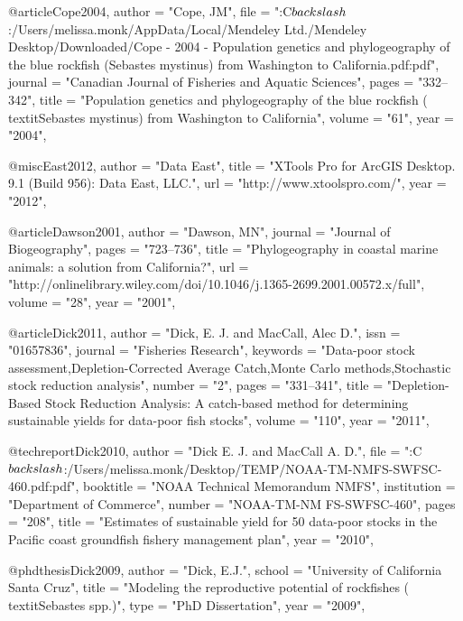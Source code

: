 @article{Cope2004,
    author = "{Cope, JM}",
    file = "{:C$\\backslash$:/Users/melissa.monk/AppData/Local/Mendeley Ltd./Mendeley Desktop/Downloaded/Cope - 2004 - Population genetics and phylogeography of the blue rockfish (Sebastes mystinus) from Washington to California.pdf:pdf}",
    journal = "{Canadian Journal of Fisheries and Aquatic Sciences}",
    pages = "{332--342}",
    title = "{{Population genetics and phylogeography of the blue rockfish (\\textit{{Sebastes} mystinus}) from Washington to California}}",
    volume = "{61}",
    year = "{2004}",
}

@misc{East2012,
    author = "{{Data East}}",
    title = "{{XTools Pro for ArcGIS Desktop. 9.1 (Build 956): Data East, LLC.}}",
    url = "{http://www.xtoolspro.com/}",
    year = "{2012}",
}

@article{Dawson2001,
    author = "{Dawson, MN}",
    journal = "{Journal of Biogeography}",
    pages = "{723--736}",
    title = "{{Phylogeography in coastal marine animals: a solution from California?}}",
    url = "{http://onlinelibrary.wiley.com/doi/10.1046/j.1365-2699.2001.00572.x/full}",
    volume = "{28}",
    year = "{2001}",
}

@article{Dick2011,
    author = "{Dick, E. J. and MacCall, Alec D.}",
    issn = "{01657836}",
    journal = "{Fisheries Research}",
    keywords = "{Data-poor stock assessment,Depletion-Corrected Average Catch,Monte Carlo methods,Stochastic stock reduction analysis}",
    number = "{2}",
    pages = "{331--341}",
    title = "{{Depletion-Based Stock Reduction Analysis: A catch-based method for determining sustainable yields for data-poor fish stocks}}",
    volume = "{110}",
    year = "{2011}",
}

@techreport{Dick2010,
    author = "{Dick E. J. and MacCall A. D.}",
    file = "{:C$\\backslash$:/Users/melissa.monk/Desktop/TEMP/NOAA-TM-NMFS-SWFSC-460.pdf:pdf}",
    booktitle = "{NOAA Technical Memorandum NMFS}",
    institution = "{Department of Commerce}",
    number = "{NOAA-TM-NM FS-SWFSC-460}",
    pages = "{208}",
    title = "{{Estimates of sustainable yield for 50 data-poor stocks in the Pacific coast groundfish fishery management plan}}",
    year = "{2010}",
}

@phdthesis{Dick2009,
    author = "{Dick, E.J.}",
    school = "{University of California Santa Cruz}",
    title = "{{Modeling the reproductive potential of rockfishes (\\textit{{Sebastes}} spp.)}}",
    type = "{PhD Dissertation}",
    year = "{2009}",
}

